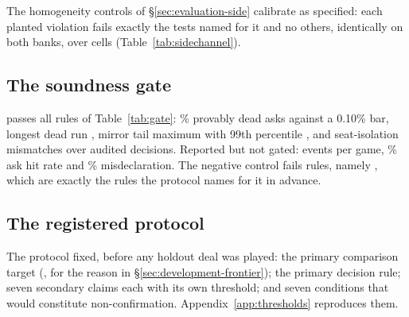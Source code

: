 \begin{table}[!ht]\centering
\caption{Calibration of the side-channel controls on holdout material. \emph{Must fail} is the set
the protocol names for each planted violation in advance. It is not one test each: the seed cheat is
visible to two of them. A control failing a test outside its set, or missing one inside it, would
mean the gate does not discriminate.}
\label{tab:sidechannel}
{\tabfont}
\end{table}

The homogeneity controls of \S\ref{sec:evaluation-side} calibrate as specified: each planted violation
fails exactly the tests named for it and no others, identically on both banks, over
\vsevenSideCells{} cells (Table~\ref{tab:sidechannel}).

\subsection{The soundness gate}
\label{sec:design-gate}

\sestina{} passes all \vsevenGateRulesWord{} rules of Table~\ref{tab:gate}: \vsevenGateDeadAsks\% provably dead asks against a
0.10\% bar, longest dead run \vsevenGateLongestDead{}, mirror tail maximum \vsevenGateTailMax{} with
99th percentile \vsevenGateTailPnn{}, and \vsevenGateSsix{} seat-isolation mismatches over
\vsevenGateSsixNodes{} audited decisions. Reported but not gated: \vsevenGateEvents{} events per game,
\vsevenGateAskHit\% ask hit rate and \vsevenGateMisdecl\% misdeclaration. The negative control fails
\vsevenNegFailCount{} rules, namely \vsevenNegFails{}, which are exactly the rules the protocol names
for it in advance.

\begin{table}[!ht]\centering
\caption{The soundness gate, \vsevenGateRulesWord{} rules, run on training material by design. The negative control is
a configuration constructed to be rejected.}
\label{tab:gate}
{\tabfont}
\end{table}

\subsection{The registered protocol}
\label{sec:design-protocol}

The protocol fixed, before any holdout deal was played: the primary comparison target (\fcheap{},
for the reason in \S\ref{sec:development-frontier}); the primary decision rule; seven secondary
claims each with its own threshold; and seven conditions that would constitute non-confirmation.
Appendix~\ref{app:thresholds} reproduces them.

